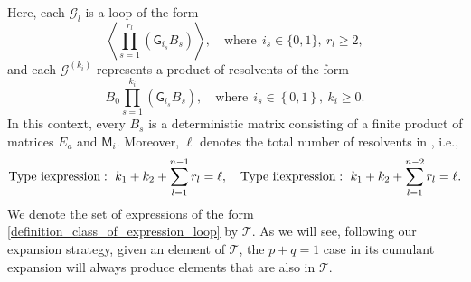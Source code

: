 \documentclass[10pt,reqno]{amsart}
\numberwithin{equation}{section}
\numberwithin{figure}{section}
\newcommand{\rmnum}[1]{\uppercase\expandafter{\romannumeral #1}}
\theoremstyle{plain} %
\theoremstyle{definition} %
\newcommand{\wt}{\widetilde}
\newcommand{\cG}{{\mathcal G}}
\newcommand{\cW}{{\mathcal W}}
\newcommand{\sG}{\mathsf G}
\newcommand{\sM}{\mathsf M}
\newcommand{\scG}{\mathscr{G}}
\renewcommand{\geq}{\ge}
\newcommand{\pa}[1]{\left({#1}\right)}
\newcommand{\ha}[1]{\left\{{#1}\right\}}
\newcommand{\avg}[1]{\langle #1 \rangle}
\newcommand{\avga}[1]{\left\langle #1 \right\rangle}
\newcommand{\tLambda}{{\wt{\Lambda}}}
\newcommand{\tl}{\tLambda}
\newcommand{\mm}{\ell}
\numberwithin{equation}{section}
\begin{document}
    Here, each $\scG_l$ is a loop of the form
    \begin{equation}\label{eq:loop}
    \avga{\prod_{s=1}^{r_l}\pa{\sG_{i_s}B_{s}}}, \quad \text{where}\ \  i_s \in \{0,1\}, \ r_l\geq 2,
    \end{equation}
    and each $\cG^{\pa{k_i}}$ represents a product of resolvents of the form
    \begin{equation}\nonumber
B_{0}\prod_{s=1}^{k_i}\pa{\sG_{i_s}B_{s}},\quad  \text{where}\ \ i_s\in\ha{0,1}, \ k_i\geq 0 . 
    \end{equation}
In this context, every $B_s$ is a deterministic matrix consisting of a finite product of matrices $E_a$ and $\sM_i$. Moreover, $\mm$ denotes the total number of resolvents in \smash{$\Gamma_n^{\pa{\mm}}$}, i.e.,
    \begin{equation}\label{number_of_G_type_1}
        \begin{aligned}
         \text{Type \rmnum{1} expression}: \   k_1+k_2+\sum_{l=1}^{n-1} r_l=\mm,\quad \text{Type \rmnum{2} expression}: \ k_1+k_2+\sum_{l=1}^{n-2} r_l=\mm .
        \end{aligned}
    \end{equation}
    We denote the set of expressions of the form \eqref{definition_class_of_expression_loop} by $\mathscr{T}$. As we will see, following our expansion strategy, given an element of $\mathscr{T}$, the $p+q=1$ case in its cumulant expansion will always produce elements that are also in $\mathscr{T}$. %
\end{document}
